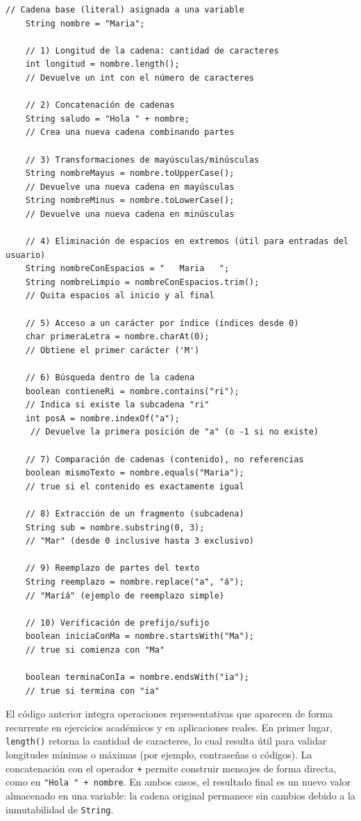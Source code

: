 \documentclass[12pt,twoside]{book}
\begin{document}
						\begin{lstlisting}[style=Java,caption={Inicialización de variables en Java.},label={lst:InicializacionVariables}]
	// Cadena base (literal) asignada a una variable
	String nombre = "Maria";
	
	// 1) Longitud de la cadena: cantidad de caracteres
	int longitud = nombre.length();                  
	// Devuelve un int con el número de caracteres
	
	// 2) Concatenación de cadenas
	String saludo = "Hola " + nombre;                
	// Crea una nueva cadena combinando partes
	
	// 3) Transformaciones de mayúsculas/minúsculas
	String nombreMayus = nombre.toUpperCase();       
	// Devuelve una nueva cadena en mayúsculas
	String nombreMinus = nombre.toLowerCase();       
	// Devuelve una nueva cadena en minúsculas
	
	// 4) Eliminación de espacios en extremos (útil para entradas del usuario)
	String nombreConEspacios = "   Maria   ";
	String nombreLimpio = nombreConEspacios.trim(); 
	// Quita espacios al inicio y al final
	
	// 5) Acceso a un carácter por índice (índices desde 0)
	char primeraLetra = nombre.charAt(0);            
	// Obtiene el primer carácter ('M')
	
	// 6) Búsqueda dentro de la cadena
	boolean contieneRi = nombre.contains("ri");      
	// Indica si existe la subcadena "ri"
	int posA = nombre.indexOf("a");                 
	 // Devuelve la primera posición de "a" (o -1 si no existe)
	
	// 7) Comparación de cadenas (contenido), no referencias
	boolean mismoTexto = nombre.equals("Maria");     
	// true si el contenido es exactamente igual
	
	// 8) Extracción de un fragmento (subcadena)
	String sub = nombre.substring(0, 3);             
	// "Mar" (desde 0 inclusive hasta 3 exclusivo)
	
	// 9) Reemplazo de partes del texto
	String reemplazo = nombre.replace("a", "á");     
	// "Maríá" (ejemplo de reemplazo simple)
	
	// 10) Verificación de prefijo/sufijo
	boolean iniciaConMa = nombre.startsWith("Ma");
	// true si comienza con "Ma"
	
	boolean terminaConIa = nombre.endsWith("ia");
	// true si termina con "ia"
						\end{lstlisting}
						
						\noindent
						El código anterior integra operaciones representativas que aparecen de forma recurrente en ejercicios académicos y en aplicaciones reales. En primer lugar, \texttt{length()} retorna la cantidad de caracteres, lo cual resulta útil para validar longitudes mínimas o máximas (por ejemplo, contraseñas o códigos). La concatenación con el operador \texttt{+} permite construir mensajes de forma directa, como en \texttt{"Hola " + nombre}. En ambos casos, el resultado final es un nuevo valor almacenado en una variable: la cadena original permanece sin cambios debido a la inmutabilidad de \texttt{String}.
						
\end{document}

